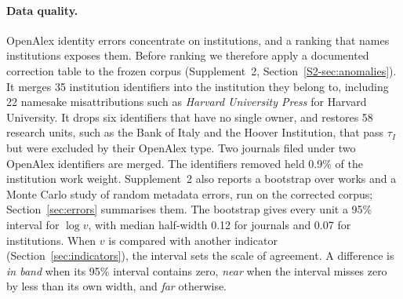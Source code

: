 \paragraph{Data quality.} OpenAlex identity errors concentrate on institutions, and a ranking that names institutions exposes them. Before ranking we therefore apply a documented correction table to the frozen corpus (Supplement~2, Section~\ref{S2-sec:anomalies}). It merges 35 institution identifiers into the institution they belong to, including 22 namesake misattributions such as \textit{Harvard University Press} for Harvard University. It drops six identifiers that have no single owner, and restores 58 research units, such as the Bank of Italy and the Hoover Institution, that pass $\tau_I$ but were excluded by their OpenAlex type. Two journals filed under two OpenAlex identifiers are merged. The identifiers removed held 0.9\% of the institution work weight. Supplement~2 also reports a bootstrap over works and a Monte Carlo study of random metadata errors, run on the corrected corpus; Section~\ref{sec:errors} summarises them. The bootstrap gives every unit a 95\% interval for $\log v$, with median half-width 0.12 for journals and 0.07 for institutions. When $v$ is compared with another indicator (Section~\ref{sec:indicators}), the interval sets the scale of agreement. A difference is \emph{in band} when its 95\% interval contains zero, \emph{near} when the interval misses zero by less than its own width, and \emph{far} otherwise.
